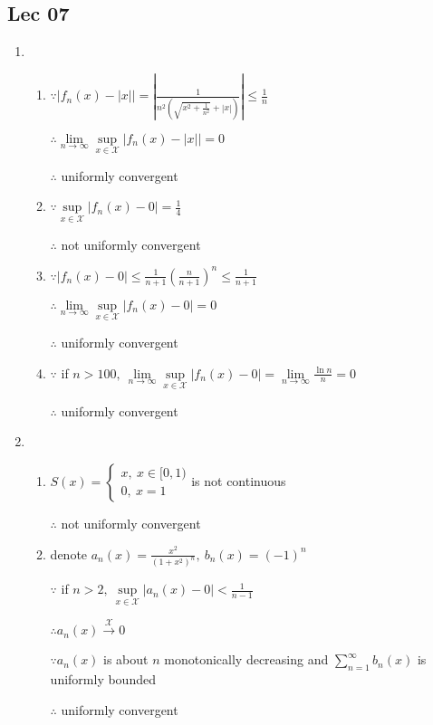 \subsection{Lec 07}
\begin{enumerate}[1]
    \item
    \begin{enumerate}[(1)]
        \item $\because \left|f_{n}(x)-|x|\right|=\left|\frac{1}{n^{2}(\sqrt{x^{2}+\frac{1}{n^{2}}}+|x|)}\right| \leq \frac{1}{n} $
        \par $ \therefore  \lim \limits_{n \rightarrow \infty} \sup \limits_{x \in \mathcal{X}}\left|f_{n}(x)-|x|\right|=0$
        \par $\therefore $ uniformly convergent 

        \item $ \because  \sup \limits_{x \in \mathcal{X}}\left|f_{n}(x)-0\right|=\frac{1}{4}$
        \par $\therefore $ not uniformly convergent 

        \item $\because \left|f_{n}(x)-0\right| \leq \frac{1}{n+1} \left(\frac{n}{n+1}\right)^{n} \leq \frac{1}{n+1} $
        \par $ \therefore  \lim \limits_{n \rightarrow \infty} \sup \limits_{x \in \mathcal{X}}\left|f_{n}(x)-0\right|=0$
        \par $\therefore $ uniformly convergent 
        
        \item $ \because $ if $n>100,\  \lim \limits_{n \rightarrow \infty} \sup \limits_{x \in \mathcal{X}}\left|f_{n}(x)-0\right|= \lim \limits_{n \rightarrow \infty} \frac{\ln n}{n} = 0 $
        \par $\therefore $ uniformly convergent     \end{enumerate}     

    \item       
        \begin{enumerate}[(1)]
        \item       
        $ S(x)= \begin{cases}  x,\ x \in [0,1)\\ 0,\ x=1 \end{cases} $is not continuous
        \par $\therefore $ not uniformly convergent
        
        \item denote $ a_{n}(x)=\frac{x^{2}}{\left(1+x^{2}\right)^{n}},\ b_{n}(x)=(-1)^{n} $
        \par  $\because$ if $n>2,\ \sup \limits_{x \in \mathcal{X}}|a_n(x)-0|<\frac{1}{n-1}$
        \par $\therefore a_{n}(x) \stackrel{\mathcal{X}}{\longrightarrow} 0$
        \par $\because a_n(x)$ is about $n$ monotonically decreasing and $\sum\limits_{n=1}^{\infty}b_n(x)$ is uniformly bounded
        \par $\therefore $  uniformly convergent


\end{enumerate}
\end{enumerate}
